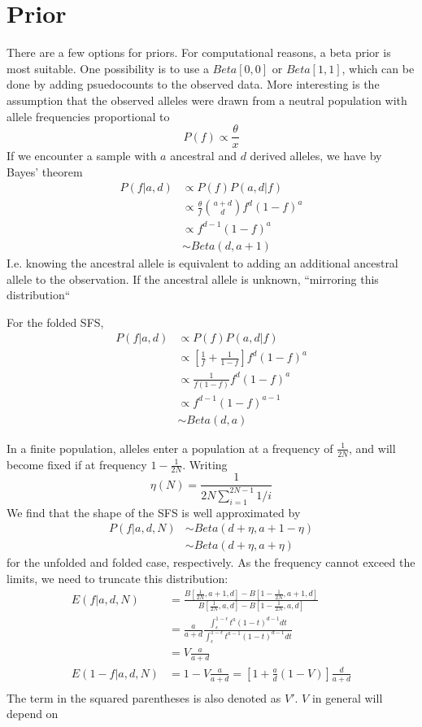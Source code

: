 \documentclass[10pt,a4paper]{article}
\begin{document}
\section{Prior}
There are a few options for priors. For computational reasons, a beta prior is most suitable.
One possibility is to use a $Beta[0,0]$ or $Beta[1,1]$, which can be done by adding psuedocounts to the observed data.
More interesting is the assumption that the observed alleles were drawn from a neutral population with allele frequencies proportional to 
\begin{equation}
P(f) \propto \frac{\theta}{x}
\end{equation}
If we encounter a sample with $a$ ancestral and $d$ derived alleles, we have by Bayes' theorem
\begin{align}
P(f | a, d) &\propto P(f) P(a, d|f) \nonumber\\
 &\propto \frac{\theta}{f} \binom{a+d}{d} f^d (1-f)^a \nonumber\\
 &\propto f^{d-1} (1-f)^a \nonumber\\
&\sim Beta(d, a+1)
\end{align}
I.e. knowing the ancestral allele is equivalent to adding an additional ancestral allele to the observation. If the ancestral allele is unknown, ``mirroring this distribution``

For the folded SFS,
\begin{align}
P(f | a, d) &\propto P(f) P(a, d|f) \nonumber\\
&\propto \left[ \frac{1}{f} + \frac{1}{1-f}\right] f^d (1-f)^a\nonumber\\
&\propto \frac{1}{f(1-f)} f^d (1-f)^a\nonumber\\
&\propto f^{d-1} (1-f)^{a-1} \nonumber\\
&\sim Beta(d, a)
\end{align}

In a finite population, alleles enter a population at a frequency of $\frac{1}{2N}$, and will become fixed if at frequency $1-\frac{1}{2N}$. Writing
$$\eta(N) = \frac{1}{2N \sum_{i=1}^{2N-1}1/i}$$
We find that the shape of the SFS is well approximated by 
\begin{align}
P(f | a, d, N) &\sim Beta(d + \eta, a+1 - \eta)\\
&\sim Beta(d + \eta, a + \eta)
\end{align}
for the unfolded and folded case, respectively. As the frequency cannot exceed the limits, we need to truncate this distribution:
\begin{align}
E(f | a, d, N) &= \frac{B[\frac{1}{2N}, a+1, d]-B[1-\frac{1}{2N}, a+1, d]}{B[\frac{1}{2N}, a, d]-B[1-\frac{1}{2N}, a, d]}\nonumber\\
&= \frac{a}{a+d} \frac{\int_\epsilon^{1-\epsilon} t^a(1-t)^{d-1}dt}
{\int_\epsilon^{1-\epsilon} t^{a-1}(1-t)^{d-1}dt}\nonumber\\
&= V \frac{a}{a+d}\\
E(1-f | a, d, N)&= 1-V\frac{a}{a+d} = \left[1 + \frac{a}{d} (1-V)\right] \frac{d}{a+d}\\
\end{align}
The term in the squared parentheses is also denoted as $V'$. $V$ in general will depend on 
		
\end{document}
